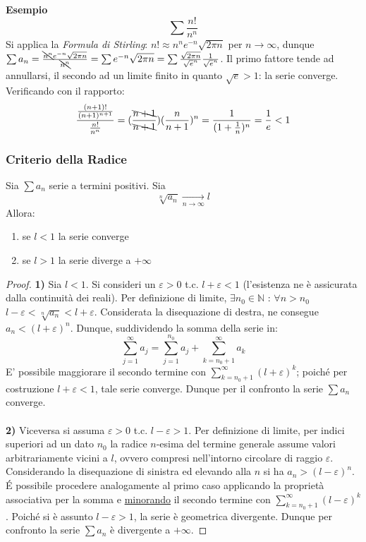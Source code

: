 \documentclass[10pt]{article}
\theoremstyle{plain}
\begin{document}
\textbf{Esempio}
\begin{equation*}
    \sum \frac{n!}{n^n}
\end{equation*}
Si applica la \textit{Formula di Stirling}: $n! \approx n^n e^{-n} \sqrt{2 \pi n}$ per $n \rightarrow \infty$, dunque $\sum a_n = \frac{\bcancel{n^n}e^{-n}\sqrt{2 \pi n}}{\bcancel{n^n}} = \sum e^{-n}\sqrt{2 \pi n} = \sum \frac{\sqrt{2 \pi n}}{\sqrt{e}^n} \frac{1}{\sqrt{e}^n}$. Il primo fattore tende ad annullarsi, il secondo ad un limite finito in quanto $\sqrt{e} > 1$: la serie converge.
\\Verificando con il rapporto: 
\begin{equation*}
    \frac{\frac{(n+1)!}{(n+1)^{n+1}}}{\frac{n!}{n^n}} = (\frac{\bcancel{n+1}}{\bcancel{n+1}})(\frac{n}{n+1})^n = \frac{1}{(1+\frac{1}{n})^n} = \frac{1}{e} < 1
\end{equation*}

\subsubsection{Criterio della Radice}
\begin{ther}
Sia $\sum a_n$ serie a termini positivi. Sia
\[\sqrt[n]{a_n} \xrightarrow[n \rightarrow \infty]{} l\]
Allora:
\begin{enumerate}
    \item se $l < 1$ la serie converge
    \item se $l > 1$ la serie diverge a $+ \infty$
\end{enumerate}
\end{ther}
\begin{proof}
\textbf{1)} Sia $l < 1$. Si consideri un $\varepsilon > 0$ t.c. $l + \varepsilon < 1$ (l'esistenza ne è assicurata dalla continuità dei reali). Per definizione di limite, $\exists n_0 \in \mathbb{N}$ : $\forall n > n_0$ $l - \varepsilon < \sqrt[n]{a_n} < l + \varepsilon$. Considerata la disequazione di destra, ne consegue $a_n < (l + \varepsilon)^n$. Dunque, suddividendo la somma della serie in:
\[\sum \limits_{j=1}^{\infty} a_j = \sum \limits_{j=1}^{n_0} a_j + \sum \limits_{k=n_0 + 1}^{\infty} a_k\]
E' possibile maggiorare il secondo termine con $\sum \limits_{k=n_0 + 1}^{\infty} (l + \varepsilon)^k$; poiché per costruzione $l + \varepsilon < 1$, tale serie converge. Dunque per il confronto la serie $\sum a_n$ converge.
\\~\\\textbf{2)} Viceversa si assuma $\varepsilon > 0$ t.c. $l - \varepsilon > 1$. Per definizione di limite, per indici superiori ad un dato $n_0$ la radice $n$-esima del termine generale assume valori arbitrariamente vicini a $l$, ovvero compresi nell'intorno circolare di raggio $\varepsilon$. Considerando la disequazione di sinistra ed elevando alla $n$ si ha $a_n > (l - \varepsilon)^n$. \'E possibile procedere analogamente al primo caso applicando la proprietà associativa per la somma e \underline{minorando} il secondo termine con $\sum_{k= n_0 + 1}^{\infty} (l - \varepsilon)^k$. Poiché si è assunto $l - \varepsilon > 1$, la serie è geometrica divergente. Dunque per confronto la serie $\sum a_n$ è divergente a $+ \infty$.
\end{proof}
\end{document}
